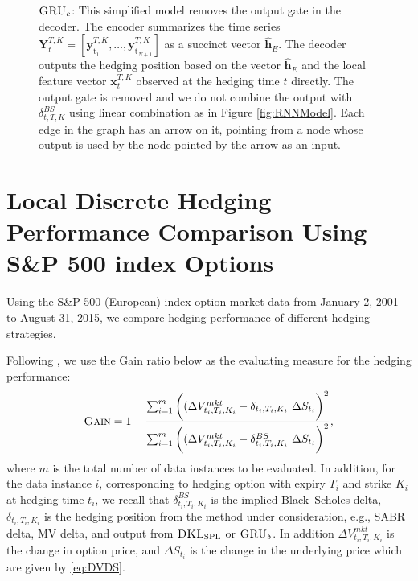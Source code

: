 \documentclass[letterpaper,12pt,titlepage,oneside,final]{book}
\numberwithin{equation}{section}
\theoremstyle{definition}
\newcommand{\model}{\textsc{GRU}_\delta}
\newcommand{\vx}{\mathbf{x}}
\newcommand{\vy}{\mathbf{y}}
\newcommand{\nt}{\breve{\text{t}}}
\newcommand{\DKLs}{\bf\textsc{DKL}_{\text{SPL}}}
\begin{document}
\begin{figure}
{
	}\caption{$\textsc{GRU}_{c}$: This simplified model removes  the output gate in  the decoder. The encoder summarizes the time series $\mathbf{Y}_{t}^{T,K}=\left[\vy^{T,K}_{\nt_{1}},\dots,\vy^{T,K}_{\nt_{N+1}}\right]$ as a succinct  vector $\widehat{\mathbf{h}}_E$. The decoder outputs the hedging position based on the vector $\widehat{\mathbf{h}}_E$ and the local feature vector $\vx^{T,K}_{t}$ observed at the hedging time $t$ directly. The output gate is removed and we do not combine the output with $\delta^{BS}_{t,T,K}$ using linear combination as in Figure \ref{fig:RNNModel}.
	Each edge in the graph has an arrow on it, pointing from a node whose output is used by the node pointed by the arrow as an input.  }
	\label{fig:DRNNC}
	\end{figure}



\chapter{Local Discrete Hedging Performance Comparison Using  S\&P 500 index Options}
\label{sec:LocalComparison}
Using the S\&P 500  ({European})  index option market data from January 2, 2001 to August 31, 2015,
we  compare hedging performance of different hedging strategies.

Following \cite{hulloptimal},  we use the Gain ratio below as the evaluating measure for the hedging performance:
\[
\textsc{Gain}=1-\frac{\sum_{i=1}^m \bigg((\Delta V^{mkt}_{t_i,T_i,K_i}-\delta_{t_i,T_i,K_i} ~ \Delta S_{t_i} \bigg)^2}{\sum_{i=1}^m \bigg((\Delta V^{mkt}_{t_i,T_i,K_i}-\delta^{BS}_{t_i,T_i,K_i} ~ \Delta S_{t_i} \bigg)^2},
\]
where $m$ is the total number of data instances to be evaluated. In addition,  for the data instance $i$, corresponding to hedging option with expiry $T_i$ and strike $K_i$ at hedging time $t_i$, we recall that $\delta^{BS}_{t_i,T_i,K_i}$ is the implied Black–Scholes delta, $\delta_{t_i,T_i,K_i}$  is the hedging position from the method under consideration,  e.g., SABR delta,  MV delta,  and output from $\DKLs$ or $\model$.
  In addition $\Delta V^{mkt}_{t_i,T_i,K_i}$ is the change in option price, and $\Delta S_{t_i}$ is  the change in the underlying price which are given by \eqref{eq:DVDS}.
\end{document}
